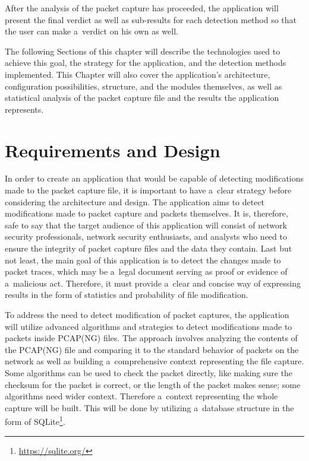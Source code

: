 \documentclass[
  printed,     %
  color,       %
  oneside,     %
  nosansbold,  %
  nocolorbold, %
  nolof,         %
  nolot,         %
]{fithesis4}
\begin{document}
After the analysis of the packet capture has proceeded, the application will present the final verdict as well as sub-results for each detection method so that the user can make a~verdict on his own as well.

The following Sections of this chapter will describe the technologies used to achieve this goal, the strategy for the application, and the detection methods implemented. This Chapter will also cover the application's architecture, configuration possibilities, structure, and the modules themselves, as well as statistical analysis of the packet capture file and the results the application represents.

\newpage

\section{Requirements and Design}

In order to create an application that would be capable of detecting modifications made to the packet capture file, it is important to have a~clear strategy before considering the architecture and design. The application aims to detect modifications made to packet capture and packets themselves. It is, therefore, safe to say that the target audience of this application will consist of network security professionals, network security enthusiasts, and analysts who need to ensure the integrity of packet capture files and the data they contain. Last but not least, the main goal of this application is to detect the changes made to packet traces, which may be a~legal document serving as proof or evidence of a~malicious act. Therefore, it must provide a~clear and concise way of expressing results in the form of statistics and probability of file modification.

To address the need to detect modification of packet captures, the application will utilize advanced algorithms and strategies to detect modifications made to packets inside PCAP(NG) files. The approach involves analyzing the contents of the PCAP(NG) file and comparing it to the standard behavior of packets on the network as well as building a~comprehensive context representing the file capture. Some algorithms can be used to check the packet directly, like making sure the checksum for the packet is correct, or the length of the packet makes sense; some algorithms need wider context. Therefore a~context representing the whole capture will be built. This will be done by utilizing a~database structure in the form of SQLite\footnote{\url{https://sqlite.org/}}.
\end{document}
